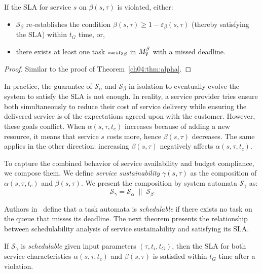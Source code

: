 \begin{thm}
\label{ch04:thm:beta}
If the SLA for service $s$ on $\beta(s,\tau)$ is violated, either:
\begin{itemize}
\item $\mathcal{S}_\beta$ re-establishes the condition $\beta(s,\tau) \geq 1-\varepsilon_\beta(s,\tau)$ (thereby satisfying the SLA) within $t_G$ time, or,
\item there exists at least one task ${\scriptsize\texttt{verify}}_\beta$ in $M^{\beta}_{{\scriptsize\texttt{V}}}$ with a missed deadline. 
\end{itemize}
\end{thm}

\begin{proof}
Similar to the proof of Theorem~\ref{ch04:thm:alpha}.
\end{proof}

In practice, the guarantee of $\mathcal{S}_\alpha$ and $\mathcal{S}_\beta$
in isolation to eventually evolve the system to satisfy the SLA is not enough.
In reality, a service provider tries ensure both simultaneously to reduce their cost of service delivery while ensuring the delivered service is of the expectations agreed upon with the customer.
However, these goals conflict.
When $\alpha(s,\tau,t_c)$ increases because of adding a new resource,
it means that service $s$ costs more, hence $\beta(s,\tau)$ decreases.
The same applies in the other direction: increasing $\beta(s,\tau)$
negatively affects $\alpha(s,\tau,t_c)$.

To capture the combined behavior of service availability and budget compliance,
we compose them. 
We define \emph{service sustainability} $\gamma(s,\tau)$ as the composition of $\alpha(s,\tau,t_c)$ and $\beta(s,\tau)$.
We present the composition by system automata $\mathcal{S}_\gamma$ as:
\[
\mathcal{S}_\gamma = \mathcal{S}_\alpha \; \parallel \; \mathcal{S}_\beta
\]

Authors in~\cite{fersman2007task} define that a task automata is \emph{schedulable} if there exists no task on the queue that misses its deadline. 
The next theorem presents the relationship between schedulability analysis of service sustainability and satisfying its SLA.

\begin{thm}
\label{ch04:thm:gamma}
If $\mathcal{S}_\gamma$ is \emph{schedulable} given input parameters $(\tau, t_i, t_G)$, then the SLA for both service characteristics $\alpha(s,\tau,t_c)$ and $\beta(s,\tau)$ is satisfied within $t_G$ time after a violation.
\end{thm}

